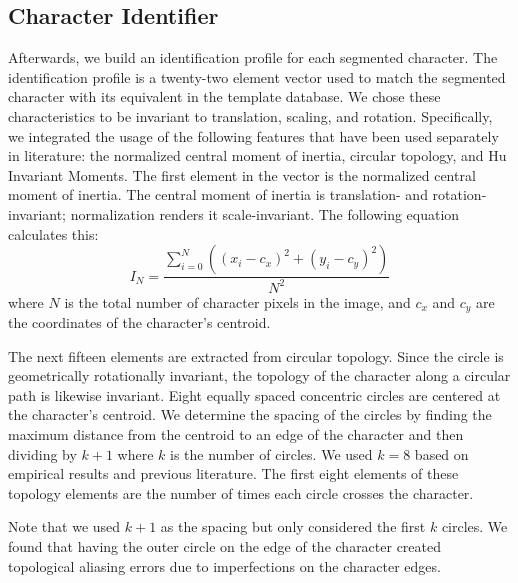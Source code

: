 \documentclass[journal]{IEEEtran}
\begin{document}
\subsection{Character Identifier}
Afterwards, we build an identification profile for each segmented character. The identification profile is a twenty-two element vector used to match the segmented character with its equivalent in the template database.
We chose these characteristics to be invariant to translation, scaling, and rotation. Specifically, we integrated the usage of the following features that have been used separately in literature:  the normalized central moment of inertia, circular topology\cite{Torres-Mendez:article_typical}, and Hu Invariant Moments\cite{Potocnik:article_typical}.
The first element in the vector is the normalized central moment of inertia\cite{Torres-Mendez:article_typical}. The central moment of inertia is translation- and rotation-invariant; normalization renders it scale-invariant. The following equation calculates this:
\begin{equation} \label{eq:central_moment_of_inertia}
I_N = \frac{\sum\limits_{i=0}^N((x_i-c_x)^2 + (y_i - c_y)^2)}{N^2}
\end{equation}
where $N$ is the total number of character pixels in the image, and $c_x$ and $c_y$ are the coordinates of the character's centroid.

The next fifteen elements are extracted from circular topology. Since the circle is geometrically rotationally invariant, the topology of the character along a circular path is likewise invariant. Eight equally spaced concentric circles are centered at the character’s centroid. We determine the spacing of the circles by finding the maximum distance from the centroid to an edge of the character and then dividing by $k+1$ where $k$ is the number of circles. We used $k=8$ based on empirical results and previous literature\cite{Torres-Mendez:article_typical}. The first eight elements of these topology elements are the number of times each circle crosses the character.

Note that we used $k+1$ as the spacing but only considered the first $k$ circles. We found that having the outer circle on the edge of the character created topological aliasing errors due to imperfections on the character edges.
\end{document}
